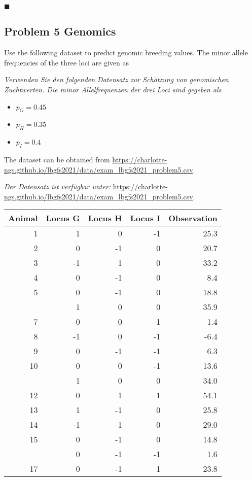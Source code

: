 \documentclass[
]{article}
\providecommand{\tightlist}{%
  \setlength{\itemsep}{0pt}\setlength{\parskip}{0pt}}
\newcommand{\solend}
{\vspace{2ex}$\blacksquare$}
\begin{document}
\solend

\clearpage
\pagebreak

\hypertarget{problem-5-genomics}{%
\subsection{Problem 5 Genomics}\label{problem-5-genomics}}

Use the following dataset to predict genomic breeding values. The minor
allele frequencies of the three loci are given as

\textit{Verwenden Sie den folgenden Datensatz zur Schätzung von genomischen Zuchtwerten. Die minor Allelfrequenzen der drei Loci sind gegeben als}

\begin{itemize}
\tightlist
\item
  \(p_G = 0.45\)
\item
  \(p_H = 0.35\)
\item
  \(p_I = 0.4\)
\end{itemize}

The dataset can be obtained from
\url{https://charlotte-ngs.github.io/lbgfs2021/data/exam_lbgfs2021_problem5.csv}.

\textit{Der Datensatz ist verfügbar unter: }
\url{https://charlotte-ngs.github.io/lbgfs2021/data/exam_lbgfs2021_problem5.csv}.

\vspace{3ex}

\begin{tabular}{rrrrr}
\toprule
Animal & Locus G & Locus H & Locus I & Observation\\
\midrule
1 & 1 & 0 & -1 & 25.3\\
2 & 0 & -1 & 0 & 20.7\\
3 & -1 & 1 & 0 & 33.2\\
4 & 0 & -1 & 0 & 8.4\\
5 & 0 & -1 & 0 & 18.8\\
\addlinespace
6 & 1 & 0 & 0 & 35.9\\
7 & 0 & 0 & -1 & 1.4\\
8 & -1 & 0 & -1 & -6.4\\
9 & 0 & -1 & -1 & 6.3\\
10 & 0 & 0 & -1 & 13.6\\
\addlinespace
11 & 1 & 0 & 0 & 34.0\\
12 & 0 & 1 & 1 & 54.1\\
13 & 1 & -1 & 0 & 25.8\\
14 & -1 & 1 & 0 & 29.0\\
15 & 0 & -1 & 0 & 14.8\\
\addlinespace
16 & 0 & -1 & -1 & 1.6\\
17 & 0 & -1 & 1 & 23.8\\
\bottomrule
\end{tabular}
\end{document}
